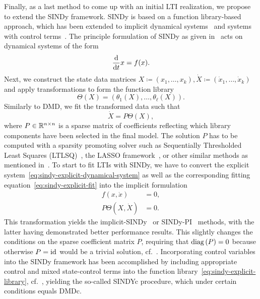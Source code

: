 Finally, as a last method to come up with an initial \ac{LTI} realization, we propose to extend the \ac{SINDy} framework.
\ac{SINDy} is based on a function library-based approach, which has been extended to implicit dynamical systems~\cite{Mangan2016, Kaheman2020} and systems with control terms~\cite{Kaiser2018}.
The principle formulation of \ac{SINDy} as given in~\cite{Brunton2016} acts on dynamical systems of the form
\begin{equation}\label{eq:sindy-explicit-dynamical-system}
    \frac{\mathop{}\!\mathrm{d}}{\mathop{}\!\mathrm{d} t} x = f(x).
\end{equation}
Next, we construct the state data matrices $X \coloneqq (x_1, \dots, x_k), \dot{X} \coloneqq (\dot{x}_1, \dots, \dot{x}_k)$ and apply transformations to form the function library
\begin{equation}\label{eq:sindy-explicit-library}
    \Theta(X) = (\theta_1(X), \dots, \theta_\ell(X)).
\end{equation}
Similarly to DMD, we fit the transformed data such that
\begin{equation}\label{eq:sindy-explicit-fit}
    \dot{X} = P \Theta(X),
\end{equation}
where $P \in \mathbb{R}^{n \times n}$ is a sparse matrix of coefficients reflecting which library components have been selected in the final model.
The solution $P$ has to be computed with a sparsity promoting solver such as Sequentially Thresholded Least Squares (LTLSQ)~\cite{Zhang2019}, the LASSO framework~\cite{Tibshirani1996}, or other similar methods as mentioned in~\cite{Kaiser2018, Kaheman2020}.
To start to fit \acp{LTI} with \ac{SINDy}, we have to convert the explicit system~\eqref{eq:sindy-explicit-dynamical-system} as well as the corresponding fitting equation~\eqref{eq:sindy-explicit-fit} into the implicit formulation
\begin{equation}\label{eq:sindy-implicit-equations}
    \begin{aligned}
        f(x, \dot{x}) &= 0, \\
        P \Theta(X, \dot{X}) &= 0.
    \end{aligned}
\end{equation}
This transformation yields the implicit-SINDy~\cite{Mangan2016} or \ac{SINDy-PI}~\cite{Kaheman2020} methods, with the latter having demonstrated better performance results.
This slightly changes the conditions on the sparse coefficient matrix $P$, requiring that $\mathop{}\!\mathrm{diag}\left(P\right) = 0$ because otherwise $P = \text{id}_{}$ would be a trivial solution, cf.~\cite[Section~3~(b)]{Kaheman2020}.
Incorporating control variables into the \ac{SINDy} framework has been accomplished by including appropriate control and mixed state-control terms into the function library~\eqref{eq:sindy-explicit-library}, cf.~\cite{Kaiser2018}, yielding the so-called \ac{SINDYc} procedure, which under certain conditions equals DMDc.
